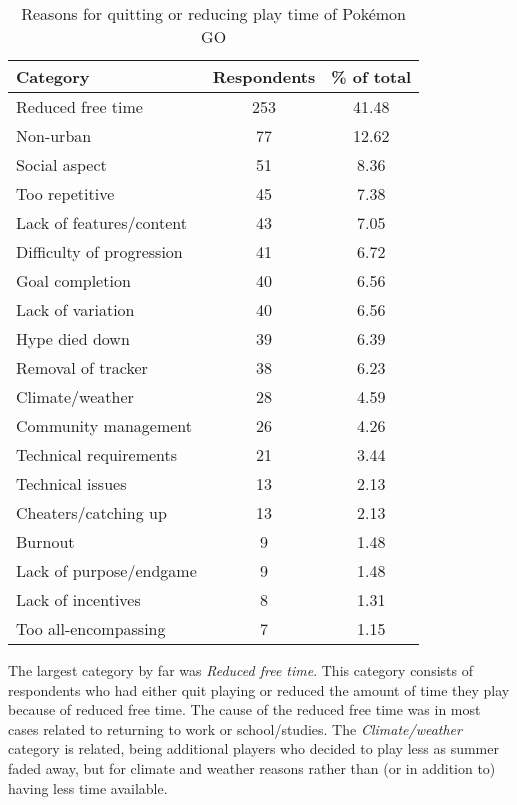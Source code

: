 \begin{table}[h]
	\centering
	\label{tbl:reasons-for-quitting}
	\begin{tabular}{|l|c|c|}
		\hline
		\textbf{Category} & \textbf{Respondents} & \textbf{\% of total}\\
		\hline\hline
		Reduced free time & 253 & 41.48\\\hline
		Non-urban & 77 & 12.62\\\hline
		Social aspect & 51 & 8.36\\\hline
		Too repetitive & 45 & 7.38\\\hline
		Lack of features/content & 43 & 7.05\\\hline
		Difficulty of progression & 41 & 6.72\\\hline
		Goal completion & 40 & 6.56\\\hline
		Lack of variation & 40 & 6.56\\\hline
		Hype died down & 39 & 6.39\\\hline
		Removal of tracker & 38 & 6.23\\\hline
		Climate/weather & 28 & 4.59\\\hline
		Community management & 26 & 4.26\\\hline
		Technical requirements & 21 & 3.44\\\hline
		Technical issues & 13 & 2.13\\\hline
		Cheaters/catching up & 13 & 2.13\\\hline
		Burnout & 9 & 1.48\\\hline
		Lack of purpose/endgame & 9 & 1.48\\\hline
		Lack of incentives & 8 & 1.31\\\hline
		Too all-encompassing & 7 & 1.15\\\hline
	\end{tabular}
	\caption{Reasons for quitting or reducing play time of Pokémon GO}
\end{table}

The largest category by far was \emph{Reduced free time}.  This category consists of respondents who had either quit playing or reduced the amount of time they play because of reduced free time. The cause of the reduced free time was in most cases related to returning to work or school/studies. The \emph{Climate/weather} category is related, being additional players who decided to play less as summer faded away, but for climate and weather reasons rather than (or in addition to) having less time available.

